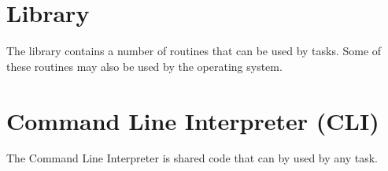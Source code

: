 \documentclass[10pt, openany]{book}
\begin{document}
\chapter{Library}
The library contains a number of routines that can be used by tasks.  Some of these routines may also be used by the operating system.

\chapter{Command Line Interpreter (CLI)}
The Command Line Interpreter is shared code that can by used by any task.
\end{document}
